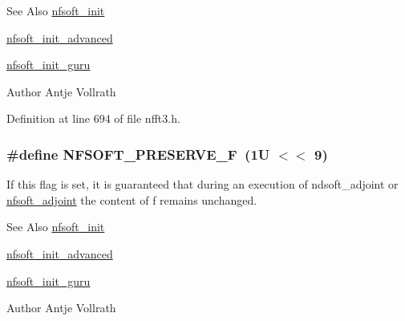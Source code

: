 \begin{DoxySeeAlso}{See Also}
\hyperlink{group__nfsoft_ga31c884458165fa204073c6c16c10775e}{nfsoft\-\_\-init} 

\hyperlink{group__nfsoft_gaf4aec4ee2a2a5d56ca27c4f1a7f90b18}{nfsoft\-\_\-init\-\_\-advanced} 

\hyperlink{group__nfsoft_ga1c13cdd3f82f48fa41acdd313cdc2052}{nfsoft\-\_\-init\-\_\-guru} 
\end{DoxySeeAlso}
\begin{DoxyAuthor}{Author}
Antje Vollrath 
\end{DoxyAuthor}


Definition at line 694 of file nfft3.\-h.

\hypertarget{group__nfsoft_ga629a86dd29a3cf09872755cd82bf7062}{
\subsubsection[{N\-F\-S\-O\-F\-T\-\_\-\-P\-R\-E\-S\-E\-R\-V\-E\-\_\-\-F}]{\setlength{\rightskip}{0pt plus 5cm}\#define N\-F\-S\-O\-F\-T\-\_\-\-P\-R\-E\-S\-E\-R\-V\-E\-\_\-\-F~(1\-U $<$$<$ 9)}}\label{group__nfsoft_ga629a86dd29a3cf09872755cd82bf7062}
If this flag is set, it is guaranteed that during an execution of ndsoft\-\_\-adjoint or \hyperlink{group__nfsoft_ga08395b1dd90f9a2565685d17460afc5b}{nfsoft\-\_\-adjoint} the content of {\ttfamily f} remains unchanged.

\begin{DoxySeeAlso}{See Also}
\hyperlink{group__nfsoft_ga31c884458165fa204073c6c16c10775e}{nfsoft\-\_\-init} 

\hyperlink{group__nfsoft_gaf4aec4ee2a2a5d56ca27c4f1a7f90b18}{nfsoft\-\_\-init\-\_\-advanced} 

\hyperlink{group__nfsoft_ga1c13cdd3f82f48fa41acdd313cdc2052}{nfsoft\-\_\-init\-\_\-guru} 
\end{DoxySeeAlso}
\begin{DoxyAuthor}{Author}
Antje Vollrath 
\end{DoxyAuthor}


